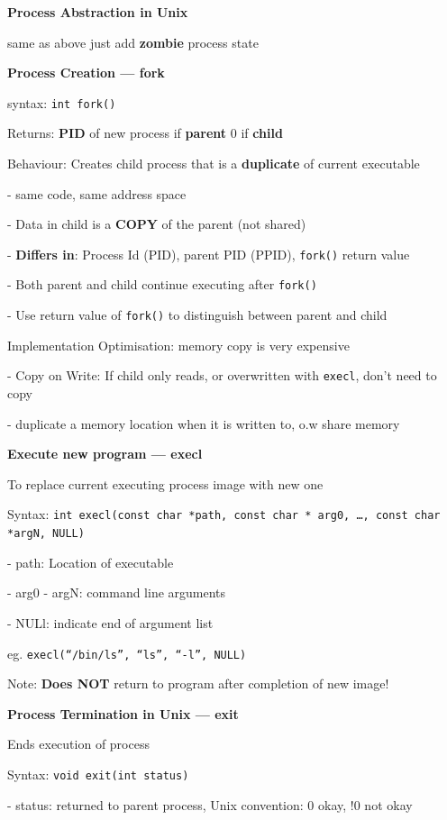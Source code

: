 \documentclass[10pt, a4paper]{article}
\newcommand{\highlight}[1]{{\color{red}\textbf{#1}}}
\newcommand{\red}[1]{{\color{red}#1}}
\newcommand{\green}[1]{{\color{ForestGreen}#1}}
\newcommand{\header}[1]{{\normalsize\textbf{#1}}}
\newcommand{\tab}[0]{\hspace*{2mm}}
\begin{document}
\begin{multicols*}{3}
		\header{Process Abstraction in Unix}

		same as above just add \textbf{zombie} process state

		\textbf{Process Creation --- fork}

		syntax: \texttt{int fork()}

		Returns: \textbf{PID} of new process if \highlight{parent} 0 if \highlight{child}


		Behaviour: Creates child process that is a \textbf{duplicate} of current executable

		\tab{} - same code, same address space

		\tab{} - Data in child is a \highlight{COPY} of the parent (not shared)

		- \highlight{Differs in}: Process Id (PID), parent PID (PPID), \texttt{fork()} return value

		- Both parent and child continue executing after \texttt{fork()}

		- Use return value of \texttt{fork()} to distinguish between parent and child

		Implementation Optimisation: memory copy is very expensive

		- \green{Copy on Write}: If child only reads, or overwritten with \texttt{execl}, don't need to copy

		- duplicate a memory location when it is written to, o.w share memory

		\textbf{Execute new program --- execl}

		To replace current executing process image with new one

		Syntax: \texttt{int execl(const char *path, const char * arg0, \dots, const char *argN, NULL)}

		\tab{} - path: Location of executable

		\tab{} - arg0 - argN: command line arguments

		\tab{} - NULl: indicate end of argument list

		eg. \texttt{execl(``/bin/ls'', ``ls'', ``-l'', NULL)}

		\red{Note}: \highlight{Does NOT} return to program after completion of new image!

		\textbf{Process Termination in Unix --- exit}

		Ends execution of process

		Syntax: \texttt{void exit(int status)}

		\tab{} - status: returned to parent process, Unix convention: 0 okay, !0 not okay


\end{multicols*}
\end{document}
